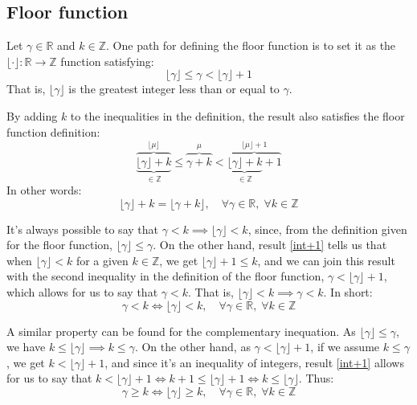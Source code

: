 \subsection*{Floor function}

Let $\gamma \in \mathds{R}$ and $k \in \mathds{Z}$.
One path for defining the floor function
is to set it as the $\lfloor \cdot \rfloor : \mathds{R} \to \mathds{Z}$
function satisfying:
\begin{equation}\tag{Floor}
  \lfloor \gamma \rfloor \le \gamma < \lfloor \gamma \rfloor + 1
\end{equation}
That is,
$\lfloor \gamma \rfloor$ is the greatest integer
less than or equal to $\gamma$.

By adding $k$ to the inequalities in the definition,
the result also satisfies the floor function definition:
\[
  \overbrace{
    \underbrace{\lfloor \gamma \rfloor + k}_{\in \mathds{Z}}
  }^{\lfloor \mu \rfloor}
  \le \overbrace{\gamma + k}^{\mu} <
  \overbrace{
    \underbrace{\lfloor \gamma \rfloor + k}_{\in \mathds{Z}} + 1
  }^{\lfloor \mu \rfloor + 1}
\]
In other words:
\begin{equation}\label{floor-int}
  \lfloor \gamma \rfloor + k = \lfloor \gamma + k \rfloor,
  \quad \forall \gamma \in \mathds{R}, \; \forall k \in \mathds{Z}
\end{equation}

It's always possible to say that
$\gamma < k \implies \lfloor \gamma \rfloor < k$,
since, from the definition given for the floor function,
$\lfloor \gamma \rfloor \le \gamma$.
On the other hand,
result \eqref{int+1} tells us that
when $\lfloor \gamma \rfloor < k$ for a given $k \in \mathds{Z}$,
we get $\lfloor \gamma \rfloor + 1 \le k$,
and we can join this result
with the second inequality in the definition of the floor function,
$\gamma < \lfloor \gamma \rfloor + 1$,
which allows for us to say that $\gamma < k$.
That is, $\lfloor \gamma \rfloor < k \implies \gamma < k$.
In short:
\begin{equation}\label{floor-switch-lt}
  \gamma < k \iff \lfloor \gamma \rfloor < k,
  \quad \forall \gamma \in \mathds{R}, \; \forall k \in \mathds{Z}
\end{equation}

A similar property can be found
for the complementary inequation.
As $\lfloor \gamma \rfloor \le \gamma$,
we have $k \le \lfloor \gamma \rfloor \implies k \le \gamma$.
On the other hand,
as $\gamma < \lfloor \gamma \rfloor + 1$,
if we assume $k \le \gamma$,
we get $k < \lfloor \gamma \rfloor + 1$,
and since it's an inequality of integers,
result \eqref{int+1} allows for us to say that
$k < \lfloor \gamma \rfloor + 1 \iff
 k + 1 \le \lfloor \gamma \rfloor + 1 \iff
 k \le \lfloor \gamma \rfloor$.
Thus:
\begin{equation}\label{floor-switch-ge}
  \gamma \ge k \iff \lfloor \gamma \rfloor \ge k,
  \quad \forall \gamma \in \mathds{R}, \; \forall k \in \mathds{Z}
\end{equation}

